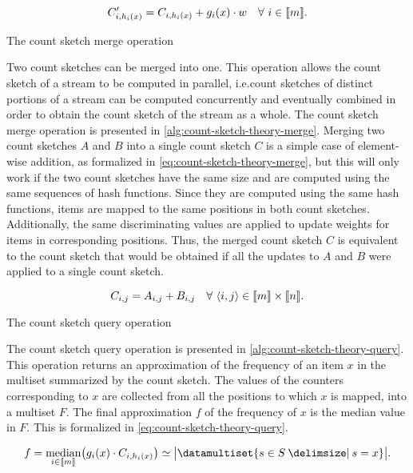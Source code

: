 \begin{equation}
  \label{eq:count-sketch-theory-update}
  C'_{i, h_{i} (x)} = C_{i, h_{i} (x)} + g_{i} (x) \cdot w \quad \forall\ i \in \llbracket m\rrbracket.
\end{equation}

\begin{algorithm}
  \caption{The count sketch merge operation}
  \label{alg:count-sketch-theory-merge}
  
\end{algorithm}

Two count sketches can be merged into one.
This operation allows the count sketch of a stream to be computed in parallel, i.e.\@ count sketches of distinct portions of a stream can be computed concurrently and eventually combined in order to obtain the count sketch of the stream as a whole.
The count sketch merge operation is presented in \cref{alg:count-sketch-theory-merge}.
Merging two count sketches \( A \) and \( B \) into a single count sketch \( C \) is a simple case of element-wise addition, as formalized in \cref{eq:count-sketch-theory-merge}, but this will only work if the two count sketches have the same size and are computed using the same sequences of hash functions.
Since they are computed using the same hash functions, items are mapped to the same positions in both count sketches.
Additionally, the same discriminating values are applied to update weights for items in corresponding positions.
Thus, the merged count sketch \( C \) is equivalent to the count sketch that would be obtained if all the updates to \( A \) and \( B \) were applied to a single count sketch.

\begin{equation}
  \label{eq:count-sketch-theory-merge}
  C_{i, j} = A_{i, j} + B_{i, j} \quad \forall\ \langle i, j\rangle \in \llbracket m\rrbracket \times \llbracket n\rrbracket.
\end{equation}

\begin{algorithm}
  \caption{The count sketch query operation}
  \label{alg:count-sketch-theory-query}
  
\end{algorithm}

The count sketch query operation is presented in \cref{alg:count-sketch-theory-query}.
This operation returns an approximation of the frequency of an item \( x \) in the multiset summarized by the count sketch.
The values of the counters corresponding to \( x \) are collected from all the positions to which \( x \) is mapped, into a multiset \( F \).
The final approximation \( f \) of the frequency of \( x \) is the median value in \( F \).
This is formalized in \cref{eq:count-sketch-theory-query}.

\begin{equation}
  \label{eq:count-sketch-theory-query}
  f = \median_{i \in \dataintegerinterval{m}} \bigl( g_{i} (x) \cdot C_{i, h_{i} (x)} \bigr) \simeq \cardinality[\big]{\datamultiset{s \in S \suchthat s = x}}.
\end{equation}
